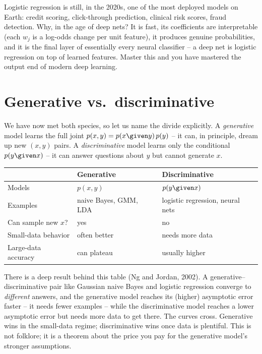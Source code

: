 \begin{applicationbox}
Logistic regression is still, in the 2020s, one of the most deployed models on
Earth: credit scoring, click-through prediction, clinical risk scores, fraud
detection. Why, in the age of deep nets? It is fast, its coefficients are
interpretable (each $w_j$ is a log-odds change per unit feature), it produces
genuine probabilities, and it is the final layer of essentially every neural
classifier -- a deep net is logistic regression on top of learned features. Master
this and you have mastered the output end of modern deep learning.
\end{applicationbox}

\section{Generative vs.\ discriminative}
\label{ch34:gen-disc}

We have now met both species, so let us name the divide explicitly. A
\emph{generative} model learns the full joint $p(x,y) = p(x\given y)\,p(y)$ -- it
can, in principle, dream up new $(x,y)$ pairs. A \emph{discriminative} model
learns only the conditional $p(y\given x)$ -- it can answer questions about $y$
but cannot generate $x$.

\begin{center}
\begin{tabular}{@{}lll@{}}
\toprule
 & \textbf{Generative} & \textbf{Discriminative} \\
\midrule
Models & $p(x,y)$ & $p(y\given x)$ \\
Examples & naive Bayes, GMM, LDA & logistic regression, neural nets \\
Can sample new $x$? & yes & no \\
Small-data behavior & often better & needs more data \\
Large-data accuracy & can plateau & usually higher \\
\bottomrule
\end{tabular}
\end{center}

\begin{happeningbox}
There is a deep result behind this table (Ng and Jordan, 2002). A
generative--discriminative pair like Gaussian naive Bayes and logistic regression
converge to \emph{different} answers, and the generative model reaches its
(higher) asymptotic error faster -- it needs fewer examples -- while the
discriminative model reaches a lower asymptotic error but needs more data to get
there. The curves cross. Generative wins in the small-data regime; discriminative
wins once data is plentiful. This is not folklore; it is a theorem about the
price you pay for the generative model's stronger assumptions.
\end{happeningbox}

